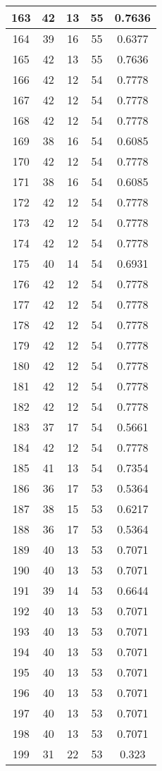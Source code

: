 \documentclass[letterpaper, 12pt]{article}
\begin{document}
\begin{longtable}{|c|c|c|c|c|}
\hline
163 & 42 & 13 & 55 & 0.7636 \\
\hline
164 & 39 & 16 & 55 & 0.6377 \\
\hline
165 & 42 & 13 & 55 & 0.7636 \\
\hline
166 & 42 & 12 & 54 & 0.7778 \\
\hline
167 & 42 & 12 & 54 & 0.7778 \\
\hline
168 & 42 & 12 & 54 & 0.7778 \\
\hline
169 & 38 & 16 & 54 & 0.6085 \\
\hline
170 & 42 & 12 & 54 & 0.7778 \\
\hline
171 & 38 & 16 & 54 & 0.6085 \\
\hline
172 & 42 & 12 & 54 & 0.7778 \\
\hline
173 & 42 & 12 & 54 & 0.7778 \\
\hline
174 & 42 & 12 & 54 & 0.7778 \\
\hline
175 & 40 & 14 & 54 & 0.6931 \\
\hline
176 & 42 & 12 & 54 & 0.7778 \\
\hline
177 & 42 & 12 & 54 & 0.7778 \\
\hline
178 & 42 & 12 & 54 & 0.7778 \\
\hline
179 & 42 & 12 & 54 & 0.7778 \\
\hline
180 & 42 & 12 & 54 & 0.7778 \\
\hline
181 & 42 & 12 & 54 & 0.7778 \\
\hline
182 & 42 & 12 & 54 & 0.7778 \\
\hline
183 & 37 & 17 & 54 & 0.5661 \\
\hline
184 & 42 & 12 & 54 & 0.7778 \\
\hline
185 & 41 & 13 & 54 & 0.7354 \\
\hline
186 & 36 & 17 & 53 & 0.5364 \\
\hline
187 & 38 & 15 & 53 & 0.6217 \\
\hline
188 & 36 & 17 & 53 & 0.5364 \\
\hline
189 & 40 & 13 & 53 & 0.7071 \\
\hline
190 & 40 & 13 & 53 & 0.7071 \\
\hline
191 & 39 & 14 & 53 & 0.6644 \\
\hline
192 & 40 & 13 & 53 & 0.7071 \\
\hline
193 & 40 & 13 & 53 & 0.7071 \\
\hline
194 & 40 & 13 & 53 & 0.7071 \\
\hline
195 & 40 & 13 & 53 & 0.7071 \\
\hline
196 & 40 & 13 & 53 & 0.7071 \\
\hline
197 & 40 & 13 & 53 & 0.7071 \\
\hline
198 & 40 & 13 & 53 & 0.7071 \\
\hline
199 & 31 & 22 & 53 & 0.323 \\
\hline
\end{longtable}
\end{document}
